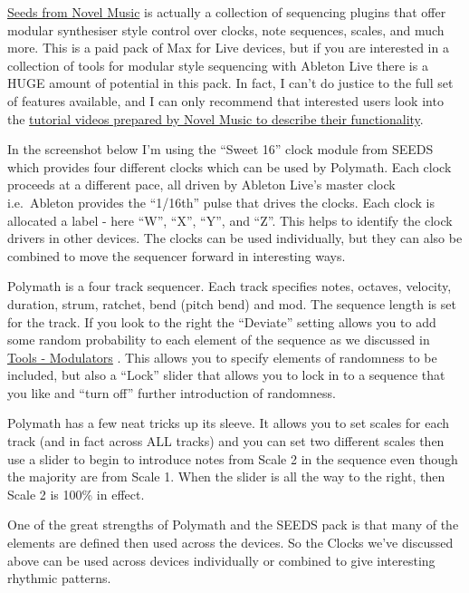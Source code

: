 \documentclass[
  12pt,
  letterpaper,
  oneside,
  open=any]{scrbook}
\makeatletter
\newcommand*\pandocbounded[1]{%
  \sbox\pandoc@box{#1}%
  \Gscale@div\@tempa{\textheight}{\dimexpr\ht\pandoc@box+\dp\pandoc@box\relax}%
  \Gscale@div\@tempb{\linewidth}{\wd\pandoc@box}%
  \ifdim\@tempb\p@<\@tempa\p@\let\@tempa\@tempb\fi%
  \ifdim\@tempa\p@<\p@\scalebox{\@tempa}{\usebox\pandoc@box}%
  \else\usebox{\pandoc@box}%
  \fi%
}
\makeatother
\begin{document}
\href{https://www.novelmusic.org/m4l/seeds}{Seeds from Novel Music} is
actually a collection of sequencing plugins that offer modular
synthesiser style control over clocks, note sequences, scales, and much
more. This is a paid pack of Max for Live devices, but if you are
interested in a collection of tools for modular style sequencing with
Ableton Live there is a HUGE amount of potential in this pack. In fact,
I can't do justice to the full set of features available, and I can only
recommend that interested users look into the
\href{https://youtube.com/playlist?list=PLjyWHWk9AS6MMpgD88K4U6TICgEjjClFR}{tutorial
videos prepared by Novel Music to describe their functionality}.

In the screenshot below I'm using the ``Sweet 16'' clock module from
SEEDS which provides four different clocks which can be used by
Polymath. Each clock proceeds at a different pace, all driven by Ableton
Live's master clock i.e.~Ableton provides the ``1/16th'' pulse that
drives the clocks. Each clock is allocated a label - here ``W'', ``X'',
``Y'', and ``Z''. This helps to identify the clock drivers in other
devices. The clocks can be used individually, but they can also be
combined to move the sequencer forward in interesting ways.

Polymath is a four track sequencer. Each track specifies notes, octaves,
velocity, duration, strum, ratchet, bend (pitch bend) and mod. The
sequence length is set for the track. If you look to the right the
``Deviate'' setting allows you to add some random probability to each
element of the sequence as we discussed in
\hyperref[007-Tools-Modulators]{Tools - Modulators} . This allows you to
specify elements of randomness to be included, but also a ``Lock''
slider that allows you to lock in to a sequence that you like and ``turn
off'' further introduction of randomness.

\pandocbounded{\texttt{[image: images/Polymath.png]}}

Polymath has a few neat tricks up its sleeve. It allows you to set
scales for each track (and in fact across ALL tracks) and you can set
two different scales then use a slider to begin to introduce notes from
Scale 2 in the sequence even though the majority are from Scale 1. When
the slider is all the way to the right, then Scale 2 is 100\% in effect.

One of the great strengths of Polymath and the SEEDS pack is that many
of the elements are defined then used across the devices. So the Clocks
we've discussed above can be used across devices individually or
combined to give interesting rhythmic patterns.
\end{document}
